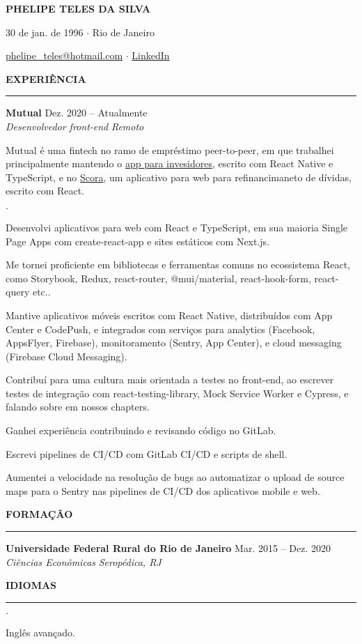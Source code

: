 \documentclass[12pt,letterpaper]{article}
\newenvironment{tightlist}
  {\begin{list}
    {$\cdot$}
    {
      \setlength{\leftmargin}{0em}
      \setlength{\itemsep}{-\smallskipamount}
    }
  }
{\end{list}}
\begin{document}
\pagestyle{empty}

\centerline{\huge\bf PHELIPE TELES DA SILVA}
\medskip

\centerline{30 de jan. de 1996 $\cdot$ Rio de Janeiro}
\smallskip

\centerline{
  \href{mailto:phelipe_teles@hotmail.com}{phelipe\_teles@hotmail.com}
  $\cdot$
  \href{https://linkedin.com/in/phelipeteles}{LinkedIn}
}
\smallskip

\medskip \textbf{EXPERIÊNCIA} \medskip
\hrule

\textbf{Mutual} \hfill Dez. 2020 -- Atualmente \\
\emph{Desenvolvedor front-end} \hfill \emph{Remoto} {\parfillskip=0pt\par}

Mutual é uma fintech no ramo de empréstimo peer-to-peer, em que trabalhei
principalmente mantendo o \href{https://mutual.club/en/invest.html}{app para
invesidores}, escrito com React Native e TypeScript, e no
\href{https://scora.com.br/}{Scora}, um aplicativo para web para refinancimaneto
de dívidas, escrito com React.

\medskip

\begin{tightlist}
  \item Desenvolvi aplicativos para web com React e TypeScript, em sua maioria
    Single Page Apps com create-react-app e sites estáticos com Next.js.
  \item Me tornei proficiente em bibliotecas e ferramentas comuns no ecossistema
    React, como Storybook, Redux, react-router, @mui/material, react-hook-form,
    react-query etc..
  \item Mantive aplicativos móveis escritos com React Native, distribuídos com
    App Center e CodePush, e integrados com serviços para analytics (Facebook,
    AppsFlyer, Firebase), monitoramento (Sentry, App Center), e cloud messaging
    (Firebase Cloud Messaging).
  \item Contribuí para uma cultura mais orientada a testes no front-end,
    ao escrever testes de integração com react-testing-library, Mock Service
    Worker e Cypress, e falando sobre em nossos chapters.
  \item Ganhei experiência contribuindo e revisando código no GitLab.
  \item Escrevi pipelines de CI/CD com GitLab CI/CD e scripts de shell.
  \item Aumentei a velocidade na resolução de bugs ao automatizar o upload de
    source maps para o Sentry nas pipelines de CI/CD dos aplicativos mobile e
    web.
\end{tightlist}

\medskip \textbf{FORMAÇÃO} \medskip
\hrule

\textbf{Universidade Federal Rural do Rio de Janeiro} \hfill {Mar. 2015 -- Dez. 2020} \\
\emph{Ciências Econômicas} \hfill \emph{Seropédica, RJ} {\parfillskip=0pt\par}

\medskip \textbf{IDIOMAS} \medskip
\hrule

\begin{tightlist}
  \item Inglês avançado.
\end{tightlist}
\end{document}
